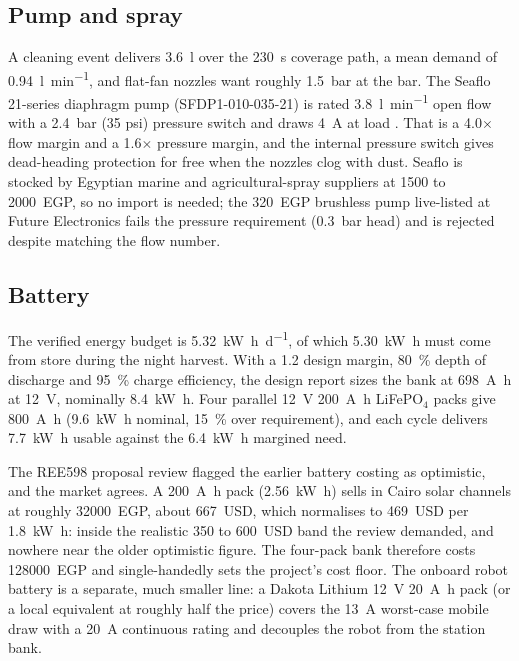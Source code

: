 \documentclass[11pt,a4paper]{article}
\begin{document}
\subsection{Pump and spray}
A cleaning event delivers \SI{3.6}{\litre} over the \SI{230}{\second}
coverage path, a mean demand of \SI{0.94}{\litre\per\minute}, and
flat-fan nozzles want roughly \SI{1.5}{\bar} at the bar. The Seaflo
21-series diaphragm pump (SFDP1-010-035-21) is rated
\SI{3.8}{\litre\per\minute} open flow with a \SI{2.4}{\bar} (35 psi)
pressure switch and draws \SI{4}{\ampere} at load \cite{seaflo2023pump}.
That is a 4.0$\times$ flow margin and a 1.6$\times$ pressure margin, and
the internal pressure switch gives dead-heading protection for free when
the nozzles clog with dust. Seaflo is stocked by Egyptian marine and
agricultural-spray suppliers at \num{1500} to \num{2000}~EGP, so no import
is needed; the \num{320}~EGP brushless pump live-listed at Future
Electronics fails the pressure requirement (\SI{0.3}{\bar} head) and is
rejected despite matching the flow number.

\subsection{Battery}
\label{sec:battery}
The verified energy budget is \SI{5.32}{\kilo\watt\hour\per\day}, of which
\SI{5.30}{\kilo\watt\hour} must come from store during the night harvest.
With a 1.2 design margin, \SI{80}{\percent} depth of discharge and
\SI{95}{\percent} charge efficiency, the design report sizes the bank at
\SI{698}{\ampere\hour} at \SI{12}{\volt}, nominally
\SI{8.4}{\kilo\watt\hour}. Four parallel \SI{12}{\volt}
\SI{200}{\ampere\hour} LiFePO$_4$ packs give \SI{800}{\ampere\hour}
(\SI{9.6}{\kilo\watt\hour} nominal, \SI{15}{\percent} over requirement),
and each cycle delivers \SI{7.7}{\kilo\watt\hour} usable against the
\SI{6.4}{\kilo\watt\hour} margined need.

The REE598 proposal review flagged the earlier battery costing as
optimistic, and the market agrees. A \SI{200}{\ampere\hour} pack
(\SI{2.56}{\kilo\watt\hour}) sells in Cairo solar channels at roughly
\num{32000}~EGP, about \num{667}~USD, which normalises to
\num{469}~USD per \SI{1.8}{\kilo\watt\hour}: inside the realistic 350 to
600~USD band the review demanded, and nowhere near the older optimistic
figure. The four-pack bank therefore costs \num{128000}~EGP and single-handedly
sets the project's cost floor. The onboard robot battery is a separate,
much smaller line: a Dakota Lithium \SI{12}{\volt} \SI{20}{\ampere\hour}
pack \cite{dakota2023battery} (or a local equivalent at roughly half the
price) covers the \SI{13}{\ampere} worst-case mobile draw with a
\SI{20}{\ampere} continuous rating and decouples the robot from the
station bank.
\end{document}
